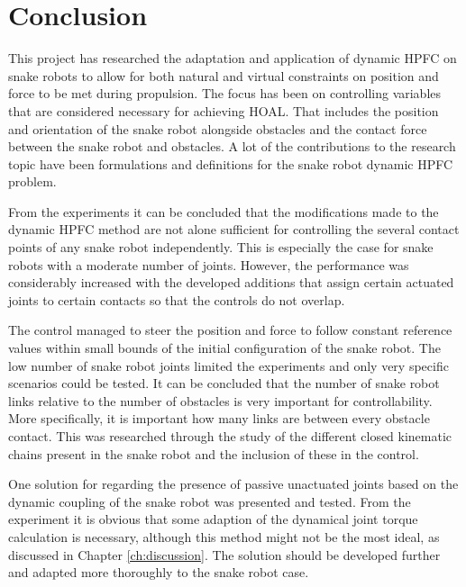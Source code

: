 \chapter{Conclusion}\label{ch:conclusion}

This project has researched the adaptation and application of dynamic HPFC on snake robots to allow for both natural and virtual constraints on position and force to be met during propulsion. The focus has been on controlling variables that are considered necessary for achieving HOAL. That includes the position and orientation of the snake robot alongside obstacles and the contact force between the snake robot and obstacles. A lot of the contributions to the research topic have been formulations and definitions for the snake robot dynamic HPFC problem.

From the experiments it can be concluded that the modifications made to the dynamic HPFC method are not alone sufficient for controlling the several contact points of any snake robot independently. This is especially the case for snake robots with a moderate number of joints. However, the performance was considerably increased with the developed additions that assign certain actuated joints to certain contacts so that the controls do not overlap.


The control managed to steer the position and force to follow constant reference values within small bounds of the initial configuration of the snake robot. The low number of snake robot joints limited the experiments and only very specific scenarios could be tested. It can be concluded that the number of snake robot links relative to the number of obstacles is very important for controllability. More specifically, it is important how many links are between every  obstacle contact. This was researched through the study of the different closed kinematic chains present in the snake robot and the inclusion of these in the control.

One solution for regarding the presence of passive unactuated joints based on the dynamic coupling of the snake robot was presented and tested. From the experiment it is obvious that some adaption of the dynamical joint torque calculation is necessary, although this method might not be the most ideal, as discussed in Chapter \ref{ch:discussion}. The solution should be developed further and adapted more thoroughly to the snake robot case.


